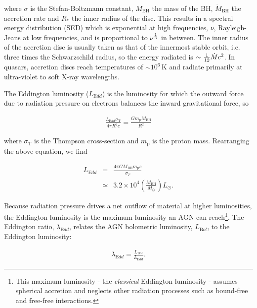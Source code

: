 \noindent where $\sigma$ is the Stefan-Boltzmann constant, $M_{\text{BH}}$ the mass of the BH, $\dot M_{\text{BH}}$ the accretion rate and $R_*$ the inner radius of the disc.
This results in a spectral energy distribution (SED) which is exponential at high frequencies, $\nu$, Rayleigh-Jeans at low frequencies, and is proportional to $\nu^{1\over 3}$ in between.
The inner radius of the accretion disc is usually taken as that of the innermost stable orbit, i.e. three times the Schwarzschild radius, so the energy radiated is $\sim {1\over12}\dot M c^2$.
In quasars, accretion discs reach temperatures of $\sim10^6$\,K and radiate primarily at ultra-violet to soft X-ray wavelengths.

The Eddington luminosity ($L_{\mathrm Edd}$) is the luminosity for which the outward force due to radiation pressure on electrons balances the inward gravitational force, so

\begingroup\makeatletter{}\check@mathfonts
\begin{eqnarray}
\frac{L_{\mathrm Edd}\sigma_{\mathrm T}}{4\pi R^2 c} = \frac{G m_{\text{p}} M_{\text{BH}}}{R^2}
\end{eqnarray}
\endgroup

\noindent where $\sigma_{\mathrm T}$ is the Thompson cross-section and $m_{\text{p}}$ is the proton mass.
Rearranging the above equation, we find

\begingroup\makeatletter{}\check@mathfonts
\begin{eqnarray}
L_{\mathrm Edd} &=& \frac{4 \pi G M_{\text{BH}} m_{\text{p}} c}{\sigma_T} \\
&\simeq&3.2\times10^4\left(\frac{M_{\text{BH}}}{M_\odot}\right)L_\odot.
\end{eqnarray}
\endgroup

Because radiation pressure drives a net outflow of material at higher luminosities, the Eddington luminosity is the maximum luminosity an AGN can reach\footnote{This maximum luminosity - the {\em classical} Eddington luminosity - assumes spherical accretion and neglects other radiation processes such as bound-free and free-free interactions.}.
The Eddington ratio, $\lambda_{\mathrm Edd}$, relates the AGN bolometric luminosity, $L_{\mathrm Bol}$, to the Eddington luminosity:

\begingroup\makeatletter{}\check@mathfonts
\begin{eqnarray}
\lambda_{\mathrm Edd} = \frac {L_{\mathrm Bol}} {L_{\mathrm Edd}}.
\end{eqnarray}
\endgroup 

